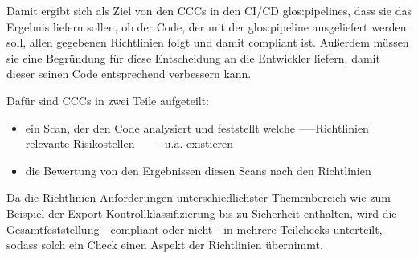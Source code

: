 \documentclass[../main.tex]{subfiles}
\begin{document}
Damit ergibt sich als Ziel von den \glspl{CCC} in den \gls{CI/CD} \glspl{glos:pipeline}, dass sie das Ergebnis liefern sollen, ob der Code, der mit der \gls{glos:pipeline} ausgeliefert werden soll, allen gegebenen Richtlinien folgt und damit compliant ist.
Außerdem müssen sie eine Begründung für diese Entscheidung an die Entwickler liefern, damit dieser seinen Code entsprechend verbessern kann.

Dafür sind \glspl{CCC} in zwei Teile aufgeteilt:
\begin{itemize}
    \item ein Scan, der den Code analysiert und feststellt welche -----Richtlinien relevante Risikostellen------- u.\"a. existieren 
    \item die Bewertung von den Ergebnissen diesen Scans nach den Richtlinien
  \end{itemize}

Da die Richtlinien Anforderungen unterschiedlichster Themenbereich wie zum Beispiel der Export Kontrollklassifizierung bis zu Sicherheit enthalten, wird die Gesamtfeststellung - compliant oder nicht - in mehrere Teilchecks unterteilt, sodass solch ein Check einen Aspekt der Richtlinien übernimmt. 
\end{document}
